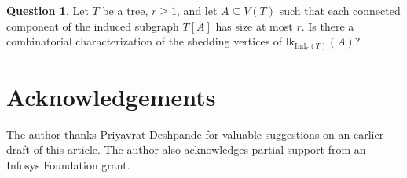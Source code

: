 \documentclass[12pt,reqno]{amsart}
\theoremstyle{definition}
\newtheorem{question}[theorem]{Question}
\def\Ind{\mathrm{Ind}}
\def\lk{\mathrm{lk}}
\begin{document}
\begin{question}
Let $T$ be a tree, $r \ge 1$, and let $A \subseteq V(T)$ such that each connected component of the induced subgraph $T[A]$ has size at most $r$. Is there a combinatorial characterization of the shedding vertices of 
$\lk_{\Ind_r(T)}(A)$?
\end{question} 






\section*{Acknowledgements}

The author thanks Priyavrat Deshpande for valuable suggestions on an earlier draft of this article. The author also acknowledges partial support from an Infosys Foundation grant.


\nocite{*}
\end{document}
